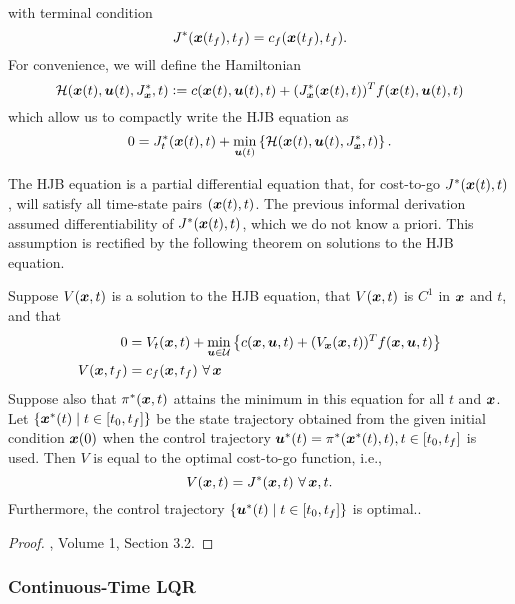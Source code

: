 with terminal condition
\begin{equation}
    J^*(\bm{x}(t_f),t_f) = c_f(\bm{x}(t_f),t_f).
\end{equation}
For convenience, we will define the Hamiltonian 
\begin{equation}
    \mathcal{H}(\bm{x}(t),\bm{u}(t),J^*_{\bm{x}},t) \vcentcolon= c(\bm{x}(t),\bm{u}(t),t) + (J_{\bm{x}}^*(\bm{x}(t),t))^T f(\bm{x}(t),\bm{u}(t),t)
\end{equation}
which allow us to compactly write the HJB equation as 
\begin{equation}
    0 = J^*_t(\bm{x}(t),t) + \min_{\bm{u}(t)} \left\{ \mathcal{H}(\bm{x}(t),\bm{u}(t),J^*_{\bm{x}},t) \right\}.
\end{equation}

The HJB equation is a partial differential equation that, for cost-to-go $J^*(\bm{x}(t),t)$, will satisfy all time-state pairs $(\bm{x}(t),t)$. The previous informal derivation assumed differentiability of $J^*(\bm{x}(t),t)$, which we do not know a priori. This assumption is rectified by the following theorem on solutions to the HJB equation. 

\begin{theorem}
Suppose $V(\bm{x},t)$ is a solution to the HJB equation, that $V(\bm{x},t)$ is $C^1$ in $\bm{x}$ and $t$, and that
\begin{align*}
    0 &= V_t(\bm{x},t) + \min_{\bm{u} \in \mathcal{U}} \left\{ c(\bm{x},\bm{u},t) + (V_{\bm{x}}(\bm{x},t))^T f(\bm{x},\bm{u},t) \right\}\\
    V(\bm{x},t_f) &= c_f(\bm{x},t_f)\,\, \forall \, \bm{x}
\end{align*}
Suppose also that $\pi^*(\bm{x},t)$ attains the minimum in this equation for all $t$ and $\bm{x}$. Let $\{\bm{x}^*(t) \mid t \in [t_0, t_f]\}$ be the state trajectory obtained from the given initial condition $\bm{x}(0)$ when the control trajectory $\bm{u}^*(t) = \pi^*(\bm{x}^*(t),t), t \in [t_0, t_f]$ is used. Then $V$ is equal to the optimal cost-to-go function, i.e.,
\begin{equation}
    V(\bm{x},t) = J^*(\bm{x},t)\,\, \forall\, \bm{x}, t.
\end{equation}
Furthermore, the control trajectory $\{\bm{u}^*(t)\mid t \in [t_0, t_f]\}$ is optimal..
\end{theorem}

\begin{proof}
\cite{bertsekas1995dynamic}, Volume 1, Section 3.2.
\end{proof}

\subsubsection{Continuous-Time LQR}

